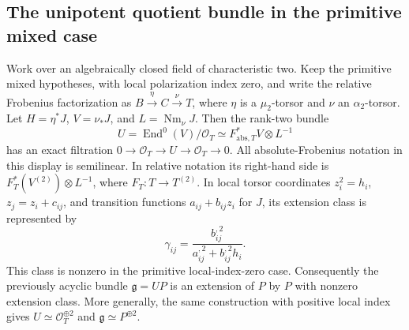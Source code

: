 \subsection{The unipotent quotient bundle in the primitive mixed case}

\begin{lemma}
\label{lem:DE-A3-primitive-unipotent-candidate}
Work over an algebraically closed field of characteristic two. Keep the
primitive mixed hypotheses, with local polarization index zero,
and write the relative Frobenius factorization as
\(B\xrightarrow{\eta}C\xrightarrow{\nu}T\), where \(\eta\) is a
\(\mu _2\)-torsor and \(\nu\) an \(\alpha _2\)-torsor. Let
\(H=\eta^*J\), \(V=\nu_*J\), and \(L=\operatorname{Nm}_\nu J\).
Then the rank-two bundle
\[
 U=\operatorname{End}^0(V)/\mathcal O_T
   \simeq F_{\mathrm{abs},T}^*V\otimes L^{-1}
\]
has an exact filtration \(0\to\mathcal O_T\to U\to\mathcal O_T\to0\).
All absolute-Frobenius notation in this display is semilinear. In relative
notation its right-hand side is \(F_T^*(V^{(2)})\otimes L^{-1}\), where
\(F_T:T\to T^{(2)}\).
In local torsor coordinates \(z_i^2=h_i\), \(z_j=z_i+c_{ij}\), and
transition functions \(a_{ij}+b_{ij}z_i\) for \(J\), its extension class
is represented by
\[
 \gamma_{ij}=\frac{b_{ij}^{,2}}{a_{ij}^{,2}+b_{ij}^{,2}h_i}.
 \tag{DE-UB1}
\]
This class is nonzero in the primitive local-index-zero case.
Consequently the previously acyclic bundle \(\mathfrak g=UP\) is an
extension of \(P\) by \(P\) with nonzero extension class.
More generally, the same construction with positive local index gives
\(U\simeq\mathcal O_T^{\oplus2}\) and
\(\mathfrak g\simeq P^{\oplus2}\).
\end{lemma}
